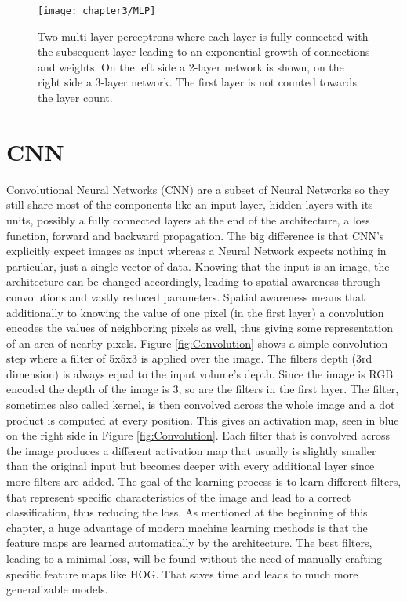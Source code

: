 \begin{figure}[H]
  \centering
  \caption{Two multi-layer perceptrons where each layer is fully connected with the subsequent layer leading to an exponential growth of connections and weights. On the left side a 2-layer network is shown, on the right side a 3-layer network. The first layer is not counted towards the layer count. \cite{cs231nconvolution}}
  \texttt{[image: chapter3/MLP]}
  \label{fig:MLP}
\end{figure}

\section{CNN}

Convolutional Neural Networks (CNN) are a subset of Neural Networks so they still share most of the components like an input layer, hidden layers with its units, possibly a fully connected layers at the end of the architecture, a loss function, forward and backward propagation. The big difference is that CNN's explicitly expect images as input whereas a Neural Network expects nothing in particular, just a single vector of data. Knowing that the input is an image, the architecture can be changed accordingly, leading to spatial awareness through convolutions and vastly reduced parameters. Spatial awareness means that additionally to knowing the value of one pixel (in the first layer) a convolution encodes the values of neighboring pixels as well, thus giving some representation of an area of nearby pixels. Figure \ref{fig:Convolution} shows a simple convolution step where a filter of 5x5x3 is applied over the image. The filters depth (3rd dimension) is always equal to the input volume's depth. Since the image is RGB encoded the depth of the image is 3, so are the filters in the first layer. The filter, sometimes also called kernel, is then convolved across the whole image and a dot product is computed at every position. This gives an activation map, seen in blue on the right side in Figure \ref{fig:Convolution}. Each filter that is convolved across the image produces a different activation map that usually is slightly smaller than the original input but becomes deeper with every additional layer since more filters are added. The goal of the learning process is to learn different filters, that represent specific characteristics of the image and lead to a correct classification, thus reducing the loss. As mentioned at the beginning of this chapter, a huge advantage of modern machine learning methods is that the feature maps are learned automatically by the architecture. The best filters, leading to a minimal loss, will be found without the need of manually crafting specific feature maps like HOG. That saves time and leads to much more generalizable models.

